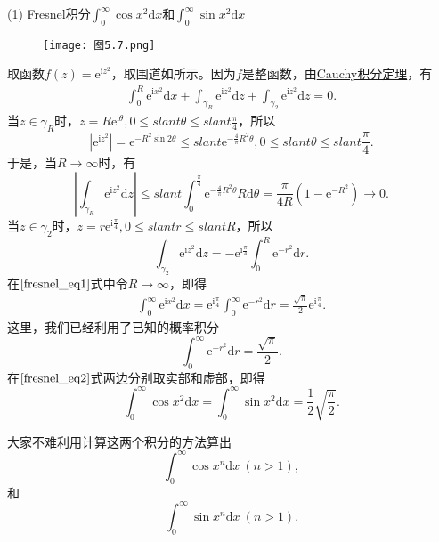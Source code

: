 \documentclass[../../main.tex]{subfiles}
\begin{document}
(1) Fresnel积分\(\int_{0}^{\infty} \cos x^2 \mathrm{d}x\)和\(\int_{0}^{\infty} \sin x^2 \mathrm{d}x\)
\begin{figure}[H]
\centering
\texttt{[image: 图5.7.png]}
\caption{}
\label{figure:图5.7}
\end{figure}
取函数\( f(z) = \mathrm{e}^{\mathrm{i}z^2} \)，取围道如所示。因为\( f \)是整函数，由\hyperref[theorem:Cauchy-Goursat定理(Cauchy积分定理)]{Cauchy积分定理}，有
\begin{align}
\int_{0}^{R} \mathrm{e}^{\mathrm{i}x^2} \mathrm{d}x + \int_{\gamma_R} \mathrm{e}^{\mathrm{i}z^2} \mathrm{d}z + \int_{\gamma_2} \mathrm{e}^{\mathrm{i}z^2} \mathrm{d}z = 0. \label{fresnel_eq1}
\end{align}
当\( z \in \gamma_R \)时，\( z = R\mathrm{e}^{\mathrm{i}\theta}, 0 \leqslant slant \theta \leqslant slant \frac{\pi}{4} \)，所以
\[
|\mathrm{e}^{\mathrm{i}z^2}| = \mathrm{e}^{-R^2 \sin 2\theta} \leqslant slant \mathrm{e}^{-\frac{4}{\pi} R^2 \theta}, 0 \leqslant slant \theta \leqslant slant \frac{\pi}{4}.
\]
于是，当\( R \to \infty \)时，有
\[
\left| \int_{\gamma_R} \mathrm{e}^{\mathrm{i}z^2} \mathrm{d}z \right| \leqslant slant \int_{0}^{\frac{\pi}{4}} \mathrm{e}^{-\frac{4}{\pi} R^2 \theta} R \mathrm{d}\theta
= \frac{\pi}{4R} (1 - \mathrm{e}^{-R^2})
\to 0.
\]
当\( z \in \gamma_2 \)时，\( z = r\mathrm{e}^{\mathrm{i}\frac{\pi}{4}}, 0 \leqslant slant r \leqslant slant R \)，所以
\[
\int_{\gamma_2} \mathrm{e}^{\mathrm{i}z^2} \mathrm{d}z = -\mathrm{e}^{\mathrm{i}\frac{\pi}{4}} \int_{0}^{R} \mathrm{e}^{-r^2} \mathrm{d}r.
\]
在\(\eqref{fresnel_eq1}\)式中令\( R \to \infty \)，即得
\begin{align}
\int_{0}^{\infty} \mathrm{e}^{\mathrm{i}x^2} \mathrm{d}x = \mathrm{e}^{\mathrm{i}\frac{\pi}{4}} \int_{0}^{\infty} \mathrm{e}^{-r^2} \mathrm{d}r
= \frac{\sqrt{\pi}}{2} \mathrm{e}^{\mathrm{i}\frac{\pi}{4}}. \label{fresnel_eq2}
\end{align}
这里，我们已经利用了已知的概率积分
\[
\int_{0}^{\infty} \mathrm{e}^{-r^2} \mathrm{d}r = \frac{\sqrt{\pi}}{2}.
\]
在\(\eqref{fresnel_eq2}\)式两边分别取实部和虚部，即得
\[
\int_{0}^{\infty} \cos x^2 \mathrm{d}x = \int_{0}^{\infty} \sin x^2 \mathrm{d}x = \frac{1}{2} \sqrt{\frac{\pi}{2}}.
\]

大家不难利用计算这两个积分的方法算出
\[
\int_{0}^{\infty} \cos x^n \mathrm{d}x \ (n > 1),
\]
和
\[
\int_{0}^{\infty} \sin x^n \mathrm{d}x \ (n > 1).
\]
\end{document}
